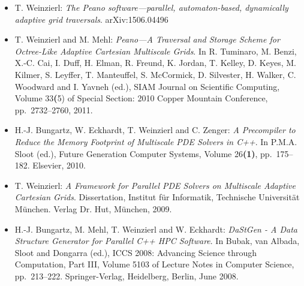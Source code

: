 \begin{itemize}
  \item T. Weinzierl: 
  {\em The {P}eano software---parallel,
   automaton-based, dynamically adaptive grid traversals}.
  arXiv:1506.04496
  \item 
  T. Weinzierl and M. Mehl: {\em Peano---A Traversal and Storage Scheme for
Octree-Like Adaptive Cartesian Multiscale Grids}.
In R. Tuminaro, M. Benzi, X.-C. Cai, I. Duff, H. Elman, R. Freund, K. Jordan, T.
Kelley, D. Keyes, M. Kilmer, S. Leyffer, T. Manteuffel, S. McCormick, D.
Silvester, H. Walker, C. Woodward and I. Yavneh (ed.), SIAM Journal on
Scientific Computing, Volume 33{\textbf(5)} of Special Section: 2010 Copper Mountain
Conference, pp.~2732--2760, 2011.
  \item 
H.-J. Bungartz, W. Eckhardt, T. Weinzierl and C. Zenger: {\em A Precompiler to
Reduce the Memory Footprint of Multiscale PDE Solvers in C++}.
In P.M.A. Sloot (ed.), Future Generation Computer Systems, Volume 26\textbf{(1)}, pp.~175--182. Elsevier, 2010.
  \item 
T. Weinzierl: {\em A Framework for Parallel PDE Solvers on Multiscale Adaptive
Cartesian Grids}.
Dissertation, Institut f\"ur Informatik, Technische Universit\"at M\"unchen. Verlag Dr. Hut, M\"unchen, 2009.
    \item 
H.-J. Bungartz, M. Mehl, T. Weinzierl and W. Eckhardt: {\em DaStGen - A Data
Structure Generator for Parallel C++ HPC Software}.
In Bubak, van Albada, Sloot and Dongarra (ed.), ICCS 2008: Advancing Science
through Computation, Part III, Volume 5103 of Lecture Notes in Computer Science,
pp.~213--222. Springer-Verlag, Heidelberg, Berlin, June 2008.
\end{itemize}
